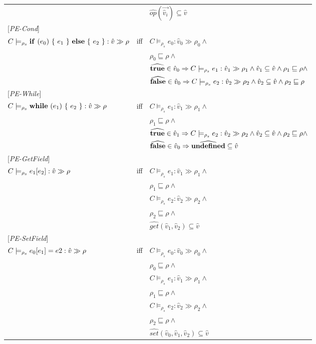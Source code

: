 \documentclass[[12pt,a4paper,twoside,openrigh]{article}
\newcommand{\vat}[0]{\hat{v}}
\newcommand{\modelrho}{\models_{\rho_s}}
\newcommand{\caesti}[2]{C \modelrho #1 : \vat_{#2} \gg \rho_{#2}}
\newcommand{\caest}[1]{C \modelrho #1 : \vat \gg \rho}
\begin{document}
\begin{tabular}{l l l}
&& $\widehat{op} (\vec{\vat_i}) \subseteq \vat $\\
{[\textit{PE-Cond}]}\\
$\caest {\cond {e_0} {e_1} {e_2}} $& iff &$ \caesti {e_0} {0} \wedge $\\
&& $\rho_0 \sqsubseteq \rho \wedge$ \\
&& $\widehat{\true} \in \vat_0 \Rightarrow \caesti {e_1} {1} \wedge \vat_1 \subseteq \vat \wedge \rho_1 \sqsubseteq \rho \wedge$ \\
&& $\widehat{\false} \in \vat_0 \Rightarrow \caesti {e_2} {2} \wedge \vat_2 \subseteq \vat \wedge \rho_2 \sqsubseteq \rho$ \\
{[\textit{PE-While}]}\\
$\caest {\while {e_1} {e_2}} $& iff &$ \caesti {e_1} {1} \wedge $\\
&& $\rho_1 \sqsubseteq \rho \wedge$ \\
&& $\widehat{\true} \in \vat_1 \Rightarrow \caesti {e_2} {2} \wedge \vat_2 \subseteq \vat \wedge \rho_2 \sqsubseteq \rho \wedge$\\
&& $\widehat{\false} \in \vat_0 \Rightarrow \widehat{\undef} \subseteq \vat$\\
{[\textit{PE-GetField}]}\\
$\caest {\lookup {e_1} {e_2}} $& iff &$ \caesti {e_1} {1} \wedge $\\
&& $\rho_1 \sqsubseteq \rho \wedge$ \\
&& $ \caesti {e_2} {2} \wedge $ \\
&& $\rho_2 \sqsubseteq \rho \wedge$ \\
&& $\widehat{get} (\vat_1, \vat_2) \subseteq \vat$ \\
{[\textit{PE-SetField}]}\\
$\caest {\store {e_0} {e_1} {e2}} $& iff &$ \caesti {e_0} {0} \wedge $\\
&& $\rho_0 \sqsubseteq \rho \wedge$ \\
&& $ \caesti {e_1} {1} \wedge $ \\
&& $\rho_1 \sqsubseteq \rho \wedge$ \\
&& $ \caesti {e_2} {2} \wedge $ \\
&& $\rho_2 \sqsubseteq \rho \wedge$ \\
&& $\widehat{set} (\vat_0, \vat_1, \vat_2) \subseteq \vat$ \\
\end{tabular}
\end{document}
